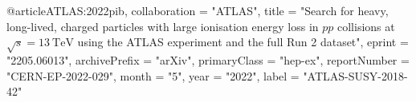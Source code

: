 @article{ATLAS:2022pib,
    collaboration = "ATLAS",
    title = "{Search for heavy, long-lived, charged particles with large ionisation energy loss in $pp$ collisions at $\sqrt{s} = 13~\text{TeV}$ using the ATLAS experiment and the full Run 2 dataset}",
    eprint = "2205.06013",
    archivePrefix = "arXiv",
    primaryClass = "hep-ex",
    reportNumber = "CERN-EP-2022-029",
    month = "5",
    year = "2022",
    label = "ATLAS-SUSY-2018-42"
}

